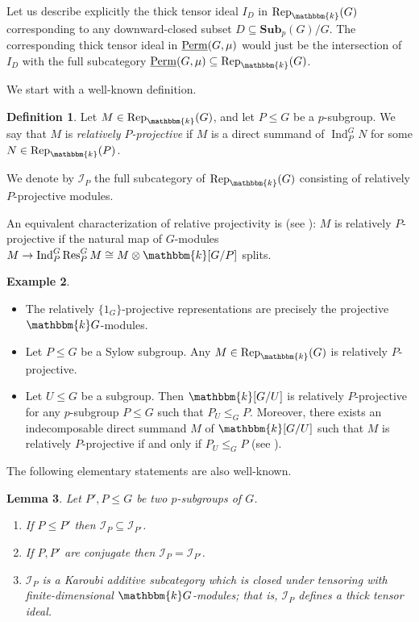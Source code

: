 \documentclass[11pt,a4paper]{amsart}
\theoremstyle{plain}%
\newtheorem{lemma}{Lemma}[subsection]
\theoremstyle{definition}
\newtheorem{definition}[lemma]{Definition}
\newtheorem{example}[lemma]{Example}
\theoremstyle{remark}
\newcommand{\Ind}{\operatorname{Ind}}
\newcommand{\Res}{\operatorname{Res}}
\newcommand{\Perm}{\underline{{\rm Perm}}}
\newcommand{\Rep}{\operatorname{Rep}}
\newcommand{\kk}{\mathbbm{k}}
\newcommand{\Sub}{\mathbf{Sub}}
\begin{document}
Let us describe explicitly the thick tensor ideal $I_D$ in $\Rep_{\kk}(G)$ corresponding to any downward-closed subset $D \subseteq \Sub_p(G)/G$. 
The corresponding thick tensor ideal in $\Perm(G, \mu)$ would just be the intersection of $I_D$ with the full subcategory $\Perm(G, \mu) \subseteq \Rep_{\kk}(G)$.

We start with a well-known definition.
\begin{definition}
    Let $M\in  \Rep_{\kk}(G)$, and let $P\leq G$ be a $p$-subgroup. We say that $M$ is \emph{relatively $P$-projective} if $M$ is a direct summand of $\Ind_P^G N$ for some $N\in \Rep_\kk(P)$.

    We denote by $\mathcal{I}_P$ the full subcategory of $\Rep_{\kk}(G)$ consisting of relatively $P$-projective modules.
\end{definition}
An equivalent characterization of relative projectivity is (see \cite[Proposition 2.3.2]{Benson}): $M$ is relatively $P$-projective if the natural map of $G$-modules $M\to \Ind_P^G \Res_P^G M\cong  M\otimes \kk[G/P]$ splits.
\begin{example}\label{ex:rel_proj}
\mbox{}
\begin{itemize}[itemindent=0pt,leftmargin=*]
\item The relatively $\{1_G\}$-projective representations are precisely the projective $\kk G$-modules.
\item Let $P\leq G$ be a Sylow subgroup. Any $M\in \Rep_{\kk}(G)$ is relatively $P$-projective. 
    \item  Let $U\leq G$ be a subgroup. Then $\kk[G/U]$ is relatively $P$-projective for any $p$-subgroup $P\leq G$ such that $P_U\leq_G P$. Moreover, there exists an indecomposable direct summand $M$ of $\kk[G/U]$ such that $M$ is relatively $P$-projective if and only if $P_U\leq_G P$ (see \cite[Chapter 4, \S 8]{NagaoTsushima}).
\end{itemize}

\end{example}
 The following elementary statements are also well-known.
\begin{lemma}
    Let $P',P\leq G$ be two $p$-subgroups of $G$.
    \begin{enumerate}
  
        \item If $P \leq P'$ then $\mathcal{I}_P \subseteq \mathcal{I}_{P'}$.
                \item If $P, P'$ are conjugate then $\mathcal{I}_P = \mathcal{I}_{P'} $.
        \item $\mathcal{I}_P$ is a Karoubi additive subcategory which is closed under tensoring with finite-dimensional $\kk G$-modules; that is, $\mathcal{I}_P$ defines a thick tensor ideal.

    \end{enumerate}
\end{lemma}
\end{document}
